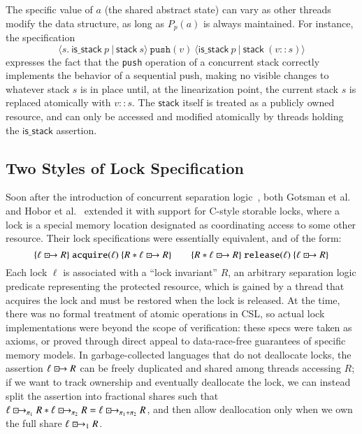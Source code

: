 \documentclass[runningheads]{llncs}
\newcommand{\islock}{\boxdotright}
\begin{document}
The specific value of $a$ (the shared abstract state) can vary as other threads modify the data structure, as long as $P_p(a)$ is always maintained. For instance, the specification \[\langle s.\ \mathsf{is\_stack}\ p\ |\ \mathsf{stack}\ s\rangle\ \texttt{push}(v)\ \langle \mathsf{is\_stack}\ p\ |\ \mathsf{stack}\ (v :: s)\rangle\] expresses the fact that the \texttt{push} operation of a concurrent stack correctly implements the behavior of a sequential push, making no visible changes to whatever stack $s$ is in place until, at the linearization point, the current stack $s$ is replaced atomically with $v :: s$. The $\mathsf{stack}$ itself is treated as a publicly owned resource, and can only be accessed and modified atomically by threads holding the $\mathsf{is\_stack}$ assertion.

\subsection{Two Styles of Lock Specification}
Soon after the introduction of concurrent separation logic~\cite{csl}, both Gotsman et al.~\cite{gotsman} and Hobor et al.~\cite{oraclesematic} extended it with support for C-style storable locks, where a lock is a special memory location designated as coordinating access to some other resource. Their lock specifications were essentially equivalent, and of the form:
\[\{ \ell \islock R \}\ \texttt{acquire}(\ell)\ \{ R * \ell \islock R \} \qquad \{ R * \ell \islock R \}\ \texttt{release}(\ell)\ \{ \ell \islock R \}\]
Each lock $\ell$ is associated with a ``lock invariant'' $R$, an arbitrary separation logic predicate representing the protected resource, which is gained by a thread that acquires the lock and must be restored when the lock is released. At the time, there was no formal treatment of atomic operations in CSL, so actual lock implementations were beyond the scope of verification: these specs were taken as axioms, or proved through direct appeal to data-race-free guarantees of specific memory models. In garbage-collected languages that do not deallocate locks, the assertion $\ell \islock R$ can be freely duplicated and shared among threads accessing $R$; if we want to track ownership and eventually deallocate the lock, we can instead split the assertion into fractional shares such that $\ell \islock_{\pi_1} R * \ell \islock_{\pi_2} R = \ell \islock_{\pi_1 + \pi_2} R$, and then allow deallocation only when we own the full share $\ell \islock_1 R$.
\end{document}
